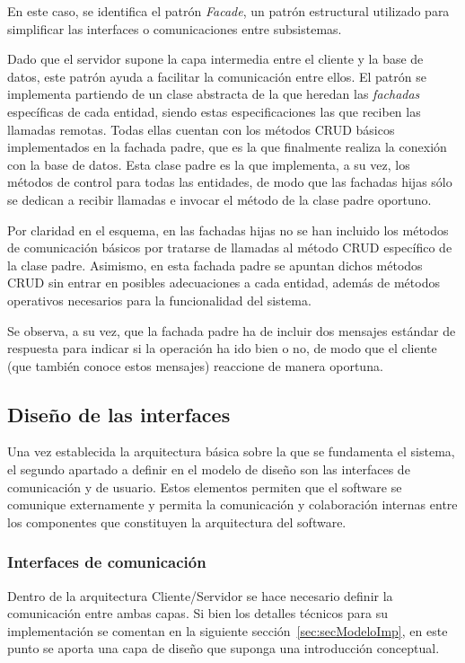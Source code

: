En este caso, se identifica el patrón \emph{Facade}, un patrón estructural utilizado para simplificar las interfaces o comunicaciones entre subsistemas.

Dado que el servidor supone la capa intermedia entre el cliente y la base de datos, este patrón ayuda a facilitar la comunicación entre ellos. El patrón se implementa partiendo de un clase abstracta de la que heredan las \emph{fachadas} específicas de cada entidad, siendo estas especificaciones las que reciben las llamadas remotas. Todas ellas cuentan con los métodos CRUD básicos implementados en la fachada padre, que es la que finalmente realiza la conexión con la base de datos. Esta clase padre es la que implementa, a su vez, los métodos de control para todas las entidades, de modo que las fachadas hijas sólo se dedican a recibir llamadas e invocar el método de la clase padre oportuno.

Por claridad en el esquema, en las fachadas hijas no se han incluido los métodos de comunicación básicos por tratarse de llamadas al método CRUD específico de la clase padre. Asimismo, en esta fachada padre se apuntan dichos métodos CRUD sin entrar en posibles adecuaciones a cada entidad, además de métodos operativos necesarios para la funcionalidad del sistema.

Se observa, a su vez, que la fachada padre ha de incluir dos mensajes estándar de respuesta para indicar si la operación ha ido bien o no, de modo que el cliente (que también conoce estos mensajes) reaccione de manera oportuna.

\subsection{Diseño de las interfaces}
\label{subsec:disenoInterfaces}

Una vez establecida la arquitectura básica sobre la que se fundamenta el sistema, el segundo apartado a definir en el modelo de diseño son las interfaces de comunicación y de usuario. Estos elementos permiten que el software se comunique externamente y permita la comunicación y colaboración internas entre los componentes que constituyen la arquitectura del software.

\subsubsection{Interfaces de comunicación}

Dentro de la arquitectura Cliente/Servidor se hace necesario definir la comunicación entre ambas capas. Si bien los detalles técnicos para su implementación se comentan en la siguiente sección~\ref{sec:secModeloImp}, en este punto se aporta una capa de diseño que suponga una introducción conceptual. 

